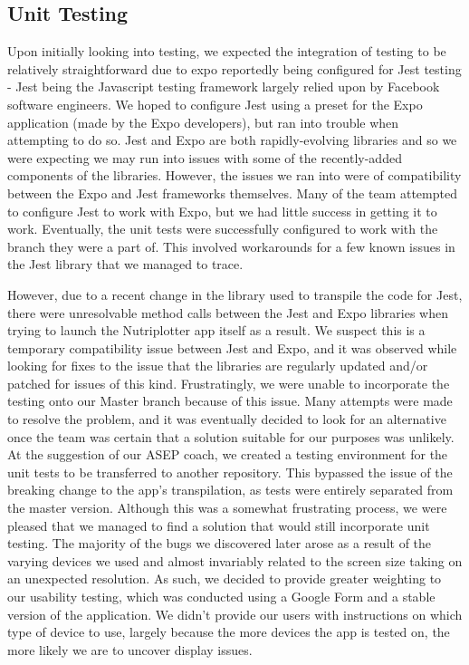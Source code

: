 \documentclass{l3proj}
\begin{document}
\subsection{Unit Testing}
\label{subsec:unit testing}
Upon initially looking into testing, we expected the integration of testing to be relatively straightforward due to expo reportedly being configured for Jest\cite{WEBSITE:jest} testing - Jest being the Javascript testing framework largely relied upon by Facebook software engineers. We hoped to configure Jest using a preset for the Expo application (made by the Expo developers), but ran into trouble when attempting to do so. Jest and Expo are both rapidly-evolving libraries and so we were expecting we may run into issues with some of the recently-added components of the libraries. However, the issues we ran into were of compatibility between the Expo and Jest frameworks themselves. Many of the team attempted to configure Jest to work with Expo, but we had little success in getting it to work. Eventually, the unit tests were successfully configured to work with the branch they were a part of. This involved workarounds for a few known issues in the Jest library that we managed to trace. \par
However, due to a recent change in the library used to transpile the code for Jest, there were unresolvable method calls between the Jest and Expo libraries when trying to launch the Nutriplotter app itself as a result. We suspect this is a temporary compatibility issue between Jest and Expo, and it was observed while looking for fixes to the issue that the libraries are regularly updated and/or patched for issues of this kind. Frustratingly, we were unable to incorporate the testing onto our Master branch because of this issue. Many attempts were made to resolve the problem, and it was eventually decided to look for an alternative once the team was certain that a solution suitable for our purposes was unlikely. At the suggestion of our ASEP coach, we created a testing environment for the unit tests to be transferred to another repository. This bypassed the issue of the breaking change to the app's transpilation, as tests were entirely separated from the master version. Although this was a somewhat frustrating process, we were pleased that we managed to find a solution that would still incorporate unit testing. The majority of the bugs we discovered later arose as a result of the varying devices we used and almost invariably related to the screen size taking on an unexpected resolution. As such, we decided to provide greater weighting to our usability testing, which was conducted using a Google Form and a stable version of the application. We didn't provide our users with instructions on which type of device to use, largely because the more devices the app is tested on, the more likely we are to uncover display issues. \par
\end{document}

